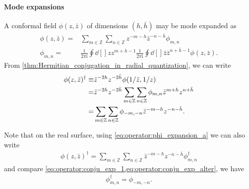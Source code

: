 \documentclass[10pt]{article}
\newcommand{\ii}{\mathrm{i}}
\begin{document}
\paragraph{Mode expansions}
A conformal field $\phi(z,\bar{z})$ of dimensions $(h,\bar{h})$ may be mode expanded as
\begin{subequations}\label{eq:operator:phi_expansion}
    \begin{align}
        \phi(z,\bar{z})= & \sum_{m\in\mathbb{Z}}\sum_{n\in\mathbb{Z}}z^{-m-h}\bar{z}^{-n-\bar{h}}\phi_{m,n}\label{eq:operator:phi_expansion_a} \\
        \phi_{m,n}=      & \frac{1}{2\pi\ii}\oint\dd[]{z}z^{m+h-1}\frac{1}{2\pi\ii}\oint\dd[]{\bar{z}}\bar{z}^{n+\bar{h}-1}\phi(z,\bar{z}).
    \end{align}
\end{subequations}
From \cref{thm:Hermitian_conjugation_in_radial_quantization}, we can write
\begin{align}
    \phi(z,\bar{z})^\dagger\equiv & \bar{z}^{-2h} z^{-2\bar{h}}\phi(1/\bar{z},1/z)\notag                                                               \\
    =                             & \bar{z}^{-2h}z^{-2\bar{h}}\sum_{m\in\mathbb{Z}}\sum_{n\in\mathbb{Z}}\phi_{m,n}\bar{z}^{m+h}z^{n+\bar{h}}\notag     \\
    =                             & \sum_{m\in\mathbb{Z}}\sum_{n\in\mathbb{Z}}\phi_{-m,-n}\bar{z}^{-m-h}z^{-n-\bar{h}}.\label{eq:operator:conju_exp_1}
\end{align}

Note that on the real surface, using \cref{eq:operator:phi_expansion_a} we can also write
\begin{align}
    \phi(z,\bar{z})^\dagger=\sum_{m\in\mathbb{Z}}\sum_{n\in\mathbb{Z}}\bar{z}^{-m-h}z^{-n-\bar{h}}\phi^\dagger_{m,n}\label{eq:operator:conju_exp_alter}
\end{align}
and compare \cref{eq:operator:conju_exp_1,eq:operator:conju_exp_alter}, we have
\begin{align}
    \phi^\dagger_{m,n}=\phi_{-m,-n}.
\end{align}
\end{document}
